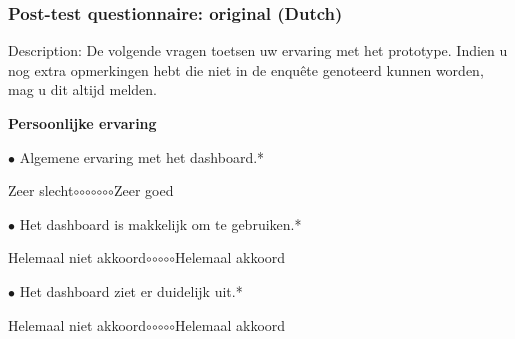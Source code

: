     \subsubsection{Post-test questionnaire: original (Dutch)}\label{appendix_posttest}

    Description: De volgende vragen toetsen uw ervaring met het prototype. Indien u nog extra opmerkingen hebt die niet in de enqu\^{e}te genoteerd kunnen worden, mag u dit altijd melden.\bigskip

    \noindent\textbf{Persoonlijke ervaring}\bigskip

    \noindent \(\bullet\) Algemene ervaring met het dashboard.*
    \vspace{-6pt}
    \begin{center}
    Zeer slecht\hspace{10pt}\(\circ\)\hspace{15pt}\(\circ\)\hspace{15pt}\(\circ\)\hspace{15pt}\(\circ\)\hspace{15pt}\(\circ\)\hspace{15pt}\(\circ\)\hspace{15pt}\(\circ\)\hspace{10pt}Zeer goed
    \end{center}

    \noindent \(\bullet\) Het dashboard is makkelijk om te gebruiken.*
    \vspace{-6pt}
    \begin{center}
    Helemaal niet akkoord\hspace{10pt}\(\circ\)\hspace{20pt}\(\circ\)\hspace{20pt}\(\circ\)\hspace{20pt}\(\circ\)\hspace{20pt}\(\circ\)\hspace{10pt}Helemaal akkoord
    \end{center}

    \noindent \(\bullet\) Het dashboard ziet er duidelijk uit.*
    \vspace{-6pt}
    \begin{center}
    Helemaal niet akkoord\hspace{10pt}\(\circ\)\hspace{20pt}\(\circ\)\hspace{20pt}\(\circ\)\hspace{20pt}\(\circ\)\hspace{20pt}\(\circ\)\hspace{10pt}Helemaal akkoord
    \end{center}

